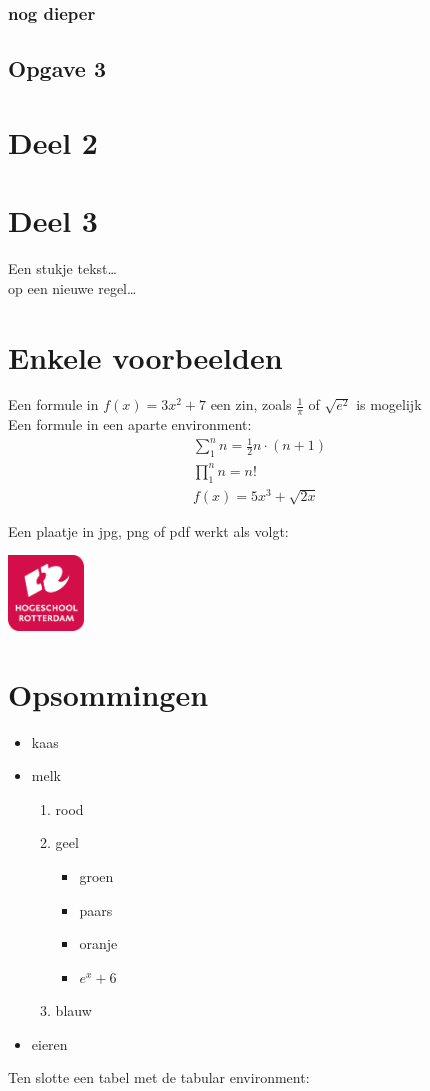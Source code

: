 \documentclass{article}
\begin{document}
\subsubsection{nog dieper}
\subsection{Opgave 3}
\section{Deel 2}
\section{Deel 3}
Een stukje tekst\ldots \\
op een nieuwe regel\ldots 
\section{Enkele voorbeelden}
Een formule in $f(x)=3x^2+7$ een zin, zoals $\frac{1}{\pi}$ of $\sqrt{e^{2}}$ is mogelijk\\
Een formule in een aparte environment:
 \begin{eqnarray}
   \sum_{1}^{n}n=\frac{1}{2}n\cdot(n+1)\\
   \prod_{1}^{n}n=n!\\
   f(x)=5x^3+\sqrt{2x}
 \end{eqnarray}
 
Een plaatje in jpg, png of pdf werkt als volgt:
 \begin{center}
\includegraphics[width=2cm]{logohr}
\end{center}
\section{Opsommingen}
\begin{itemize}
\item kaas
\item melk
  \begin{enumerate}
\item rood
\item geel
  \begin{itemize}
  \item groen
  \item paars
  \item oranje
  \item $e^x+6$
  \end{itemize}
\item blauw
\end{enumerate}
\item eieren
\end{itemize}
Ten slotte een tabel met de tabular environment:\\
\vspace{5mm}
\end{document}
